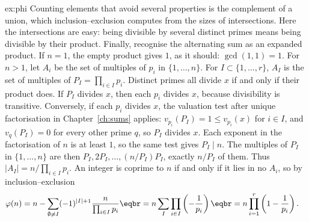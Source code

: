 \begin{solution}{ex:phi}
\idea Counting elements that avoid several properties is the complement of a union, which inclusion--exclusion computes from the sizes of intersections. Here the intersections are easy: being divisible by several distinct primes means being divisible by their product. Finally, recognise the alternating sum as an expanded product.
\writeup If $n=1$, the empty product gives $1$, as it should: $\gcd(1,1)=1$. For $n>1$, let $A_i$ be the set of multiples of $p_i$ in $\{1,\dots,n\}$. For $I\subset\{1,\dots,r\}$, $A_I$ is the set of multiples of $P_I=\prod_{i\in I}p_i$. Distinct primes all divide $x$ if and only if their product does. If $P_I$ divides $x$, then each $p_i$ divides $x$, because divisibility is transitive. Conversely, if each $p_i$ divides $x$, the valuation test after unique factorisation in Chapter~\ref{ch:sums} applies: $v_{p_i}(P_I)=1\le v_{p_i}(x)$ for $i\in I$, and $v_q(P_I)=0$ for every other prime $q$, so $P_I$ divides $x$. Each exponent in the factorisation of $n$ is at least $1$, so the same test gives $P_I\mid n$. The multiples of $P_I$ in $\{1,\ldots,n\}$ are then $P_I,2P_I,\ldots,(n/P_I)P_I$, exactly $n/P_I$ of them. Thus $|A_I|=n/\prod_{i\in I}p_i$.
An integer is coprime to $n$ if and only if it lies in no $A_i$, so by inclusion--exclusion
\[
\begin{aligned}\varphi(n)&=n-\sum_{\emptyset\ne I}(-1)^{|I|+1}\frac n{\prod_{i\in I}p_i}\eqbr=n\sum_{I}\prod_{i\in I}\left(-\frac1{p_i}\right)\eqbr=n\prod_{i=1}^r\left(1-\frac1{p_i}\right).\end{aligned}
\]
\end{solution}

